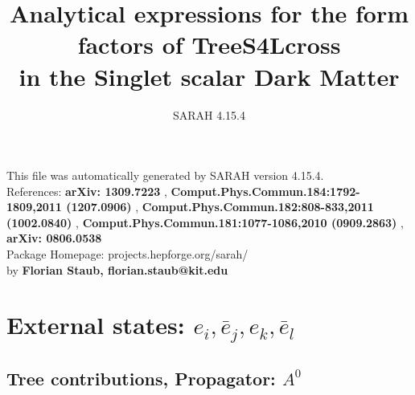 \documentclass[A4,landscape]{article}
\begin{document}
\title{Analytical expressions for the form factors of TreeS4Lcross\\ in the Singlet scalar Dark Matter } 
 \author{SARAH 4.15.4} 
 \maketitle 
 \vspace{10cm} 
This file was automatically generated by SARAH version 4.15.4.  \\ 
References: {\bf arXiv: 1309.7223 }, {\bf Comput.Phys.Commun.184:1792-1809,2011 (1207.0906) }, {\bf Comput.Phys.Commun.182:808-833,2011 (1002.0840) }, {\bf Comput.Phys.Commun.181:1077-1086,2010 (0909.2863) }, {\bf arXiv: 0806.0538 } \\ 
Package Homepage: projects.hepforge.org/sarah/ \\ 
by {\bf Florian Staub, florian.staub@kit.edu} 
 \pagebreak 
 \tableofcontents 
 \pagebreak 
\section{External states: ${e_{{i}}, \bar{e}_{{j}}, e_{{k}}, \bar{e}_{{l}}}$} 
\subsection{Tree contributions, Propagator: $A^0$} 
\end{document}
